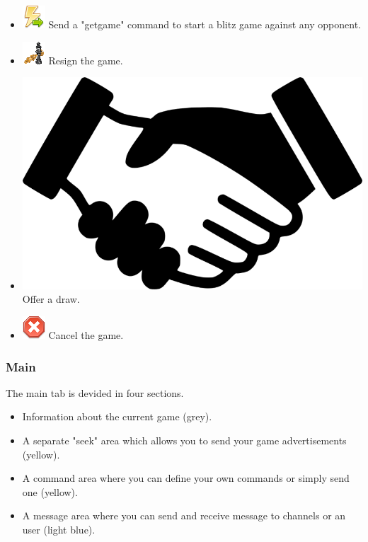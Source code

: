 \documentclass[11pt,a4paper]{article}
\begin{document}
\begin{itemize}
	\item \includegraphics[scale=0.5]{lightning_go.png} Send a "getgame" command to start a blitz game against any opponent.
	\item \includegraphics[scale=0.5]{6-2-chess-png.png} Resign the game.
	\item \includegraphics[scale=0.02]{handshake.png} Offer a draw.
	\item \includegraphics[scale=0.5]{cancel.png} Cancel the game.
\end{itemize}


\subsubsection{Main}
The main tab is devided in four sections.
\begin{itemize}
	\item Information about the current game (grey).
    \item A separate "seek" area which allows you to send your game advertisements (yellow).
	\item A command area where you can define your own commands or simply send one (yellow).
	\item A message area where you can send and receive message to channels or an user (light blue).
\end{itemize}
\end{document}
